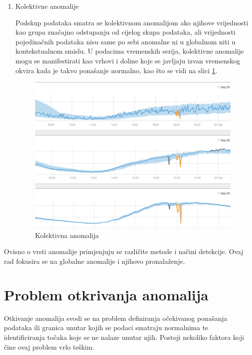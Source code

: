 \documentclass[utf8, diplomski, numeric]{fer}
\begin{document}
\begin{enumerate}
\item Kolektivne anomalije

Podskup podataka smatra se kolektivnom anomalijom ako njihove vrijednosti kao grupa značajno odstupanju od cijelog skupa podataka, ali vrijednosti pojedinačnih podataka nisu same po sebi anomalne ni u globalnom niti u kontekstualnom smislu. U podacima vremenskih serija, kolektivne anomalije mogu se manifestirati kao vrhovi i doline koje se javljaju izvan vremenskog okvira kada je takvo ponašanje normalno, kao što se vidi na slici \ref{fig:outlier3}.

\begin{figure}[htb]
\includegraphics[width=1\textwidth]{images/outlier_type3.png}
\centering
\caption{Kolektivna anomalija}
\label{fig:outlier3}
\end{figure}

\end{enumerate}

Ovisno o vrsti anomalije primjenjuju se različite metode i načini detekcije. Ovaj rad fokusira se na globalne anomalije i njihovo pronalaženje.


\section{Problem otkrivanja anomalija}
Otkivanje anomalija svodi se na problem definiranja očekivanog ponašanja podataka ili granica unutar kojih se podaci smatraju normalnima te identificiranja točaka koje se ne nalaze unutar njih. Postoji nekoliko faktora koji čine ovaj problem vrlo teškim.
\end{document}
